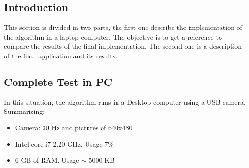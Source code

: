 \subsection{Introduction}
	This section is divided in two parts, the first one describe the implementation of the algorithm in a laptop computer. The objective is to get a reference to compare the results of the final implementation. The second one is a description of the final application and its results.

\subsection{Complete Test in PC}
	In this situation, the algorithm runs in a Desktop computer using a USB camera. Summarizing:
	
	\begin{itemize}
		\item{Camera: 30 Hz and pictures of 640x480}
		\item{Intel core i7 2.20 GHz. Usage 7\%}
		\item{6 GB of RAM. Usage $\sim$ 5000 KB}
	\end{itemize}
	
